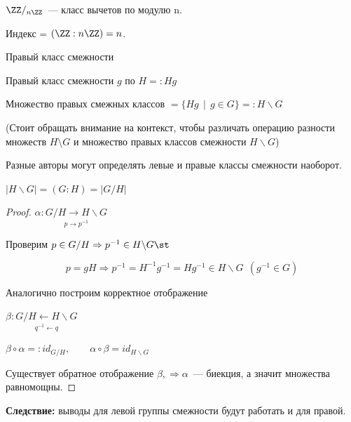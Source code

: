 \begin{Example}{}{}

    $\ZZ/_{n\ZZ}$~--- класс вычетов по модулю n.
    
    Индекс = $(\ZZ : n\ZZ) = n$.
\end{Example}

\begin{Definition}{Правый класс смежности}{}

    Правый класс смежности $g$ по $H =: Hg$

    Множество правых смежных классов $= \{ Hg \ \ | \ \ g \in G\} =: H \backslash G$
\end{Definition}

(Стоит обращать внимание на контекст, чтобы различать операцию разности множеств $H \setminus G$ и множество правых классов смежности $H \backslash G$)

\begin{remark}
    Разные авторы могут определять левые и правые классы смежности наоборот.
\end{remark}

\begin{Proposition}{}{}
    $|H \backslash G| = (G:H) = |G \slash H|$
\end{Proposition}

\begin{proof}

    $\alpha: \underset{p \rightarrow p^{-1}}{G \slash H \longrightarrow H \backslash G}$

    Проверим $p \in G \slash H \Rightarrow p^{-1} \in H \backslash G \st$

    \[
     p = gH \Rightarrow p^{-1} = H^{-1}g^{-1} = Hg^{-1} \in H \backslash G \ \ (g^{-1} \in G)
    \]

    Аналогично построим корректное отображение

    $\beta: \underset{q^{-1} \leftarrow q}{G \slash H \longleftarrow H \backslash G}$

    $\beta \circ \alpha =: id_{G \slash H}, \qquad \alpha \circ \beta = id_{H \backslash G}$

    Существует обратное отображение $\beta, \Rightarrow \alpha$~--- биекция, а значит множества равномощны.  
\end{proof}

\textbf{Следствие:} выводы для левой группы смежности будут работать и для правой.

